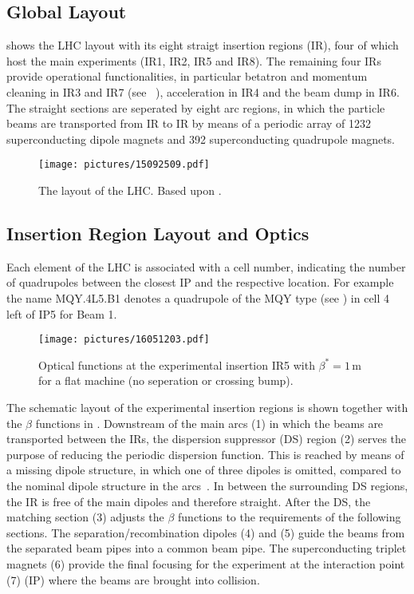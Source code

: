 \subsection{Global Layout}
%
 shows the LHC layout with its eight straigt insertion regions (IR), four of which host the main experiments (IR1, IR2, IR5 and IR8). The remaining four IRs provide operational functionalities, in particular betatron and momentum cleaning in IR3 and IR7 (see ~), acceleration in IR4 and the beam dump in IR6. The straight sections are seperated by eight arc regions, in which the particle beams are transported from IR to IR by means of a periodic array of 1232 superconducting dipole magnets and 392 superconducting quadrupole magnets. 
%
%
\begin{figure}[b]
  \centering
  \texttt{[image: pictures/15092509.pdf]}
  \caption{The layout of the LHC. Based upon \cite{Bruning2012705,CERN-2004-003-V1}.}  
  \label{pic:15032201}
\end{figure}


\subsection{Insertion Region Layout and Optics}


Each element of the LHC is associated with a cell number, indicating the number of quadrupoles between the closest IP and the respective location. For example the name MQY.4L5.B1 denotes a quadrupole of the MQY type (see \cite{CERN-2004-003-V1}) in cell 4 left of IP5 for Beam 1. 
%
\begin{figure}[b]  
    \centering
    \texttt{[image: pictures/16051203.pdf]}
    \caption{Optical functions at the experimental insertion IR5 with $\beta^*=1\,$m for a flat machine (no seperation or crossing bump).}  
    \label{pic:16051202}
\end{figure}
%
The schematic layout of the experimental insertion regions is shown together with the $\beta$ functions in . Downstream of the main arcs (1) in which the beams are transported between the IRs, the dispersion suppressor (DS) region (2) serves the purpose of reducing the periodic dispersion function. This is reached by means of a missing dipole structure, in which one of three dipoles is omitted, compared to the nominal dipole structure in the arcs~\citedr. In between the surrounding DS regions, the IR is free of the main dipoles and therefore straight. After the DS, the matching section (3) adjusts the $\beta$ functions to the requirements of the following sections. The separation/recombination dipoles (4) and (5) guide the beams from the separated beam pipes into a common beam pipe. The superconducting triplet magnets (6) provide the final focusing for the experiment at the interaction point (7) (IP) where the beams are brought into collision.

